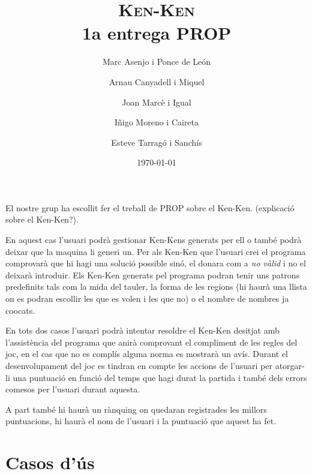 \documentclass[a4paper,12pt]{article}
\begin{document}
\title{\textsc{Ken-Ken} \\ \large 1a entrega PROP}
\author{Marc Asenjo i Ponce de León \and
	Arnau Canyadell i Miquel \and
	Joan Marcè i Igual \and
	Iñigo Moreno i Caireta \and
	Esteve Tarragó i Sanchís}

\date{\today}
\maketitle

El nostre grup ha escollit fer el treball de PROP sobre el Ken-Ken. (explicació
sobre el Ken-Ken?). 

En aquest cas l'usuari podrà gestionar Ken-Kens generats per ell o també podrà
deixar que la maquina li generi un. 
Per als Ken-Ken que l'usuari crei el programa comprovarà que hi hagi una solució
possible sinó, el donara com a \emph{no vàlid} i no el deixarà introduir. Els Ken-Ken generats 
pel programa podran tenir uns patrons predefinits tals com la mida del tauler, la forma de les 
regions (hi haurà una llista on es podran escollir les que es volen i les que no) o el nombre 
de nombres ja co\lgem ocats.

En tots dos casos l'usuari podrà intentar resoldre el Ken-Ken desitjat amb
l'assistència del programa que anirà comprovant el compliment de les regles del
joc, en el cas que no es complís alguna norma es mostrarà un avís. Durant el
desenvolupament del joc es tindran en compte les accions de l'usuari per
atorgar-li una puntuació en funció del temps que hagi durat la partida
i també dels errors comesos per l'usuari durant aquesta.

A part també hi haurà un rànquing on quedaran registrades les millors puntuacions,
hi haurà el nom de l'usuari i la puntuació que aquest ha fet.

\vspace{2cm}

\section{Casos d'ús}
\end{document}
